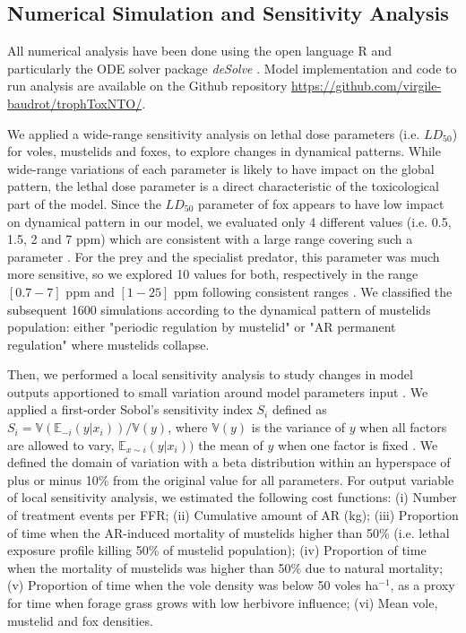 \documentclass[11pt]{article}
\begin{document}
\subsection{Numerical Simulation and Sensitivity Analysis}

All numerical analysis have been done using the open language R and particularly the ODE solver package \textit{deSolve} \citep{Soetaert2010}. Model implementation and code to run analysis are available on the Github repository \url{https://github.com/virgile-baudrot/trophToxNTO/}.


We applied a wide-range sensitivity analysis on lethal dose parameters (i.e. $LD_{50}$) for voles, mustelids and foxes, to explore changes in dynamical patterns.
%
While wide-range variations of each parameter is likely to have impact on the global pattern, the lethal dose parameter is a direct characteristic of the toxicological part of the model.
%
Since the $LD_{50}$ parameter of fox appears to have low impact on dynamical pattern in our model, we evaluated only 4 different values (i.e. 0.5, 1.5, 2 and 7 ppm) which are consistent with a large range covering such a parameter \cite{Erickson2004,Sage2010}.
%
For the prey and the specialist predator, this parameter was much more sensitive, so we explored 10 values for both, respectively in the range $[0.7-7]$ ppm and $[1-25]$ ppm following consistent ranges \cite{Grolleau1989,Erickson2004}. 
%
We classified the subsequent 1600 simulations according to the dynamical pattern of mustelids population: either "periodic regulation by mustelid" or "AR permanent regulation" where mustelids collapse.


Then, we performed a local sensitivity analysis to study changes in model outputs apportioned to small variation around model parameters input \citep{Saltelli2019}.
%
We applied a first-order Sobol's sensitivity index $S_i$ defined as $S_i = \mathbb{V}(\mathbb{E}_{-i}(y \vert x_i)) / \mathbb{V}(y)$, where $\mathbb{V}(y)$ is the variance of $y$ when all factors are allowed to vary, $\mathbb{E}_{x\sim i}(y \vert x_i))$ the mean of $y$ when one factor is fixed \citep{Sobol1993}. We defined the domain of variation with a beta distribution within an hyperspace of plus or minus 10\% from the original value for all parameters.
%
For output variable of local sensitivity analysis, we estimated the following cost functions: (i) Number of treatment events per FFR; (ii) Cumulative amount of AR (kg); (iii) Proportion of time when the AR-induced mortality of mustelids higher than 50\% (i.e. lethal exposure profile killing 50\% of mustelid population); (iv) Proportion of time when the mortality of mustelids was higher than 50\% due to natural mortality; (v) Proportion of time when the vole density was below 50 voles ha$^{-1}$, as a proxy for time when forage grass grows with low herbivore influence; (vi) Mean vole, mustelid and fox densities.
\end{document}
